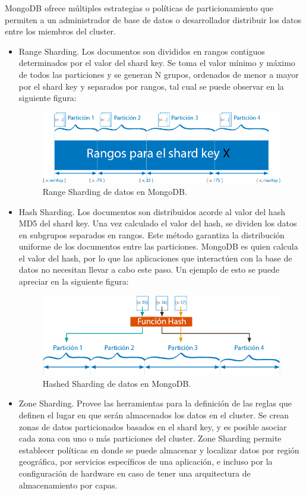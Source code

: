 MongoDB ofrece múltiples estrategias o políticas de particionamiento que permiten a un administrador de base de datos
o desarrollador distribuir los datos entre los miembros del cluster.

\begin{itemize}

\item Range Sharding. Los documentos son divididos en rangos contiguos determinados por el valor del shard key. Se toma el valor 
mínimo y máximo de todos las particiones y se generan N grupos, ordenados de menor a mayor por el shard key y separados por rangos,
tal cual se puede observar en la siguiente figura:

\begin{figure}[H]
	\centering
		\includegraphics[width=.7\textwidth]{figures/ranged_sharding}
	\caption{Range Sharding de datos en MongoDB.}
	\label{fig:ranged_sharding}
\end{figure}

\item Hash Sharding. Los documentos son distribuidos acorde al valor del hash MD5 del shard key. Una vez calculado el valor del hash, se
dividen los datos en subgrupos separados en rangos. Este método garantiza la distribución uniforme de los documentos entre las particiones.
MongoDB es quien calcula el valor del hash, por lo que las aplicaciones que interactúen con la base de datos no necesitan llevar a cabo este paso. Un ejemplo de esto se puede apreciar en la siguiente figura:

\begin{figure}[H]
	\centering
		\includegraphics[width=.7\textwidth]{figures/hashed_sharding}
	\caption{Hashed Sharding de datos en MongoDB.}
	\label{fig:hashed_sharding}
\end{figure}

\item Zone Sharding. Provee las herramientas para la definición de las reglas que definen el lugar en que serán almacenados los datos
en el cluster. Se crean zonas de datos particionados basados en el shard key, y es posible asociar cada zona con uno o más particiones
del cluster. Zone Sharding permite establecer políticas en donde se puede almacenar y localizar datos por región geográfica, por
servicios específicos de una aplicación, e incluso por la configuración de hardware en caso de tener una arquitectura de almacenamiento
por capas.


\end{itemize}
